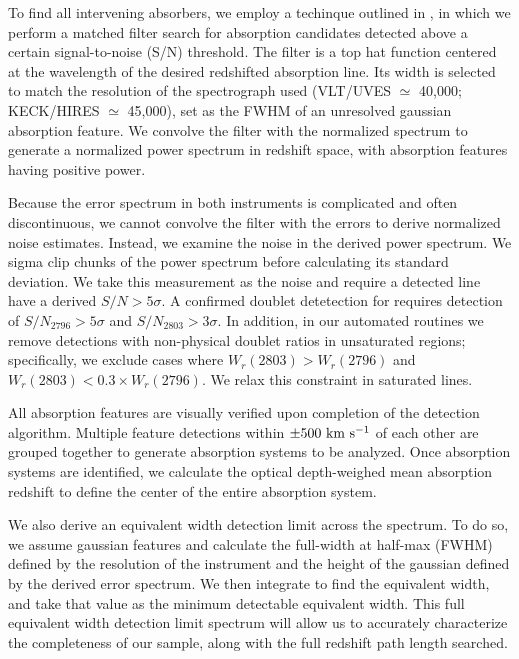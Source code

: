 \documentclass[iop,apj,numberedappendix,appendixfloats,twocolappendix]{emulateapj}
\begin{document}
To find all intervening {\MgIIdblt} absorbers, we employ a techinque outlined in \cite{Zhu2013}, in which we perform a matched filter search for absorption candidates detected above a certain signal-to-noise (S/N) threshold. The filter is a top hat function centered at the wavelength of the desired redshifted absorption line. Its width is selected to match the resolution of the spectrograph used (VLT/UVES $\simeq$ 40,000; KECK/HIRES $\simeq$ 45,000), set as the FWHM of an unresolved gaussian absorption feature. We convolve the filter with the normalized spectrum to generate a normalized power spectrum in redshift space, with absorption features having positive power. 

Because the error spectrum in both instruments is complicated and often discontinuous, we cannot convolve the filter with the errors to derive normalized noise estimates. Instead, we examine the noise in the derived power spectrum. We sigma clip chunks of the power spectrum before calculating its standard deviation. We take this measurement as the noise and require a detected line have a derived $S/N > 5\sigma$. A confirmed doublet detetection for {\MgIIdblt} requires detection of $S/N_{2796} > 5\sigma$ and $S/N_{2803} > 3\sigma$. In addition, in our automated routines we remove detections with non-physical doublet ratios in unsaturated regions; specifically, we exclude cases where $W_r(2803) > W_r(2796)$ and $W_r(2803) < 0.3 \times W_r(2796)$. We relax this constraint in saturated lines. 

All absorption features are visually verified upon completion of the detection algorithm. Multiple feature detections within $\pm 500~\hbox{km~s$^{-1}$}$ of each other are grouped together to generate absorption systems to be analyzed. Once absorption systems are identified, we calculate the optical depth-weighed mean absorption redshift to define the center of the entire absorption system.

We also derive an equivalent width detection limit across the spectrum. To do so, we assume gaussian features and calculate the full-width at half-max (FWHM) defined by the resolution of the instrument and the height of the gaussian defined by the derived error spectrum. We then integrate to find the equivalent width, and take that value as the minimum detectable equivalent width. This full equivalent width detection limit spectrum will allow us to accurately characterize the completeness of our sample, along with the full redshift path length searched. 

\end{document}
